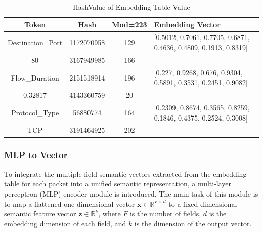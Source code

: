\begin{ZhChapter}
    \begin{table}[htbp]
        \scriptsize
        \renewcommand{\arraystretch}{1.2}
        \caption{HashValue of Embedding Table Value}
        \vspace{1em}
        \begin{tabular}{| c | c | c |l|}
            \hline
            \textbf{Token}    & \textbf{Hash} & \textbf{Mod=223} & \textbf{Embedding Vector}                                        \\
            \hline
            Destination\_Port & 1172070958    & 129              & [0.5012, 0.7061, 0.7705, 0.6871, 0.4636, 0.4809, 0.1913, 0.8319] \\
            80                & 3167949985    & 166              &                                                                  \\
            \hline
            Flow\_Duration    & 2151518914    & 196              & [0.227, 0.9268, 0.676, 0.9304, 0.5891, 0.3531, 0.2451, 0.9082]   \\
            0.32817           & 4143360759    & 20               &                                                                  \\
            \hline
            Protocol\_Type    & 56880774      & 164              & [0.2309, 0.8674, 0.3565, 0.8259, 0.1846, 0.4375, 0.2524, 0.3008] \\
            TCP               & 3191464925    & 202              &                                                                  \\
            \hline
        \end{tabular}
        \label{tab:token_embedding_table}
    \end{table}





    \subsubsection{MLP to Vector}
    To integrate the multiple field semantic vectors extracted from the embedding table for each packet into a unified semantic representation, a multi-layer perceptron (MLP) encoder module is introduced. The main task of this module is to map a flattened one-dimensional vector \(\mathbf{x} \in \mathbb{R}^{F \times d}\) to a fixed-dimensional semantic feature vector \(\mathbf{z} \in \mathbb{R}^k\), where \(F\) is the number of fields, \(d\) is the embedding dimension of each field, and \(k\) is the dimension of the output vector.


\end{ZhChapter}
